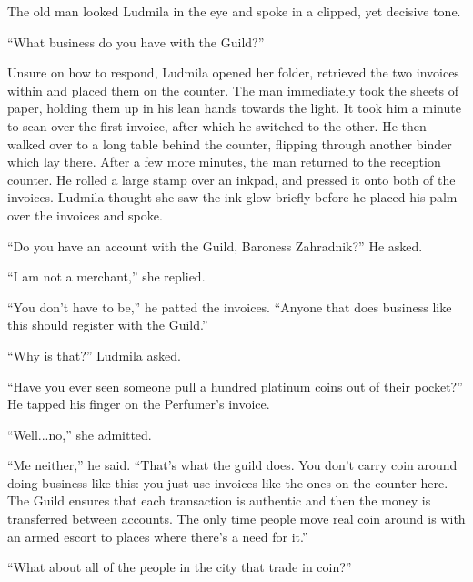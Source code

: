  

The old man looked Ludmila in the eye and spoke in a clipped, yet decisive tone.

 

“What business do you have with the Guild?”

 

Unsure on how to respond, Ludmila opened her folder, retrieved the two invoices within and placed them on the counter. The man immediately took the sheets of paper, holding them up in his lean hands towards the light. It took him a minute to scan over the first invoice, after which he switched to the other. He then walked over to a long table behind the counter, flipping through another binder which lay there. After a few more minutes, the man returned to the reception counter. He rolled a large stamp over an inkpad, and pressed it onto both of the invoices. Ludmila thought she saw the ink glow briefly before he placed his palm over the invoices and spoke.

 

“Do you have an account with the Guild, Baroness Zahradnik?” He asked.

 

“I am not a merchant,” she replied.

 

“You don’t have to be,” he patted the invoices. “Anyone that does business like this should register with the Guild.”

 

“Why is that?” Ludmila asked.

 

“Have you ever seen someone pull a hundred platinum coins out of their pocket?” He tapped his finger on the Perfumer’s invoice.

 

“Well...no,” she admitted.

 

“Me neither,” he said. “That’s what the guild does. You don’t carry coin around doing business like this: you just use invoices like the ones on the counter here. The Guild ensures that each transaction is authentic and then the money is transferred between accounts. The only time people move real coin around is with an armed escort to places where there’s a need for it.”

 

“What about all of the people in the city that trade in coin?”

 

